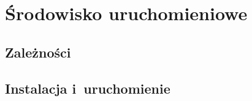 \chapter{Środowisko uruchomieniowe}\label{Chapter_EnvironmentAppendix}

  \section{Zależności}\label{Section_Dependencies}

  \section{Instalacja i~uruchomienie}\label{Section_Installation}
